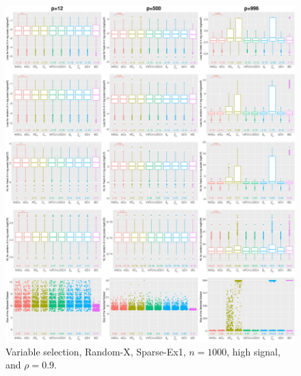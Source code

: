 \begin{figure}[!ht]
\centering
\includegraphics[width=\textwidth]{figures/supplement/randomx/subset_selection/Sparse-Ex1_n1000_hsnr_rho09.eps}
\caption{Variable selection, Random-X, Sparse-Ex1, $n=1000$, high signal, and $\rho=0.9$.}
\end{figure}
\clearpage
